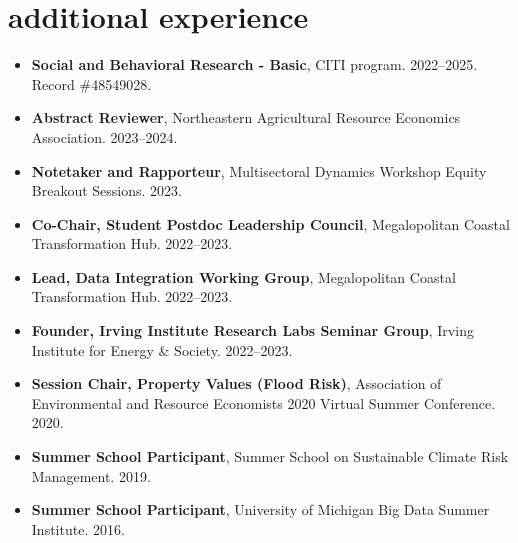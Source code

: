 \documentclass[10pt,oneside]{article}
\begin{document}

\section{additional experience}

\mbox{}\vspace{-\dimexpr\baselineskip\relax}

\begin{itemize}[label={}]
  
  \item \textbf{Social and Behavioral Research - Basic}, CITI program. 2022--2025.\\Record \#48549028.
  
  \item \textbf{Abstract Reviewer}, Northeastern Agricultural Resource Economics Association. 2023--2024.
  
  \item \textbf{Notetaker and Rapporteur}, Multisectoral Dynamics Workshop Equity Breakout Sessions. 2023.
  
  \item \textbf{Co-Chair, Student Postdoc Leadership Council}, Megalopolitan Coastal Transformation Hub. 2022--2023.
  
  \item \textbf{Lead, Data Integration Working Group}, Megalopolitan Coastal Transformation Hub. 2022--2023.
  
  \item \textbf{Founder, Irving Institute Research Labs Seminar Group}, Irving Institute for Energy \& Society. 2022--2023.
  
  \item \textbf{Session Chair, Property Values (Flood Risk)}, Association of Environmental and Resource Economists 2020 Virtual Summer Conference. 2020.
  
  \item \textbf{Summer School Participant}, Summer School on Sustainable Climate Risk Management. 2019.
  
  \item \textbf{Summer School Participant}, University of Michigan Big Data Summer Institute. 2016.
  
\end{itemize}
\end{document}
